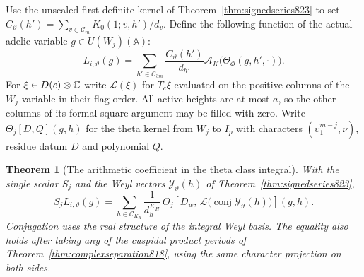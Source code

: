 \documentclass[a4paper,11pt]{article}
\newtheorem{theorem}[proposition]{Theorem}
\theoremstyle{definition}
\theoremstyle{remark}
\numberwithin{equation}{section}
\begin{document}
Use the unscaled first definite kernel of
Theorem~\ref{thm:signedseries823} to set
\(C_\vartheta(h')=\sum_{v\in\mathcal C_m}K_0(1;v,h')/d_v\).
Define the following function of the actual adelic variable
\(g\in U(W_j)(\mathbb A)\):
\[
 L_{i,\vartheta}(g)=
 \sum_{h'\in\mathcal C_{3m}}\frac{C_\vartheta(h')}{d_{h'}}
                  \mathcal A_K\bigl(\Theta_\Phi(g,h',\cdot)\bigr).
\]
For \(\xi\in D(c)\otimes\mathbb C\) write \(\mathcal L(\xi)\) for
\(T_c\xi\) evaluated on the positive columns of the \(W_j\)
variable in their flag order. All active heights are at most
\(a\), so the other columns of its formal square argument may
be filled with zero. Write \(\Theta_j[D,Q](g,h)\) for the
theta kernel from \(W_j\) to \(I_p\) with characters
\((\upsilon_1^{m-j},\nu)\), residue datum \(D\) and polynomial \(Q\).

\begin{theorem}[The arithmetic coefficient in the theta class integral]
\leavevmode\label{thm:arithmeticclass824}
With the single scalar \(S_j\) and the Weyl vectors
\(\mathcal Y_\vartheta(h)\) of Theorem~\ref{thm:signedseries823},
\[
 S_j L_{i,\vartheta}(g)=
    \sum_{h\in\mathcal C_{K_H}}\frac{1}{d_h^{K_H}}\,
       \Theta_j\!\left[D_w,\,
          \mathcal L\bigl(\operatorname{conj}\mathcal Y_\vartheta(h)\bigr)
                     \right](g,h).
\]
Conjugation uses the real structure of the integral Weyl basis.
The equality also holds after taking any of the cuspidal product
periods of Theorem~\ref{thm:complexseparation818}, using the
same character projection on both sides.
\end{theorem}
\end{document}
